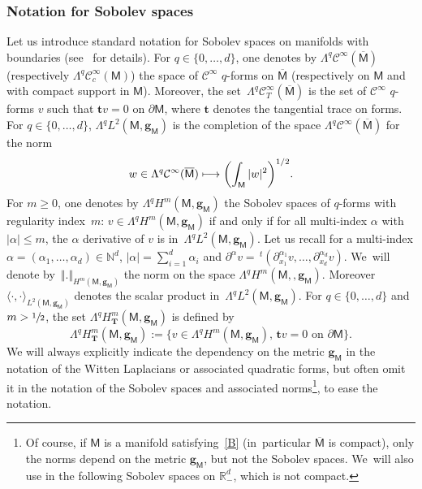 \documentclass[10pt]{amsart}
\newcommand\mto{\mathchoice{\longmapsto}{\mapsto}{\mapsto}{\mapsto}}
\newcommand{\mbf}[1]{\mathbf{#1}}
\theoremstyle{plain}
\theoremstyle{definition}
\begin{document}
\label{sec:Witt}

\subsubsection{Notation for Sobolev spaces}

Let us introduce standard notation for Sobolev spaces on manifolds
with boundaries (see~\cite{GSchw} for details).
For $q\in\{0,\ldots,d\}$, one denotes by
$\Lambda^q\mathcal C^{\infty}(\overline{\mathsf M})$ (respectively $\Lambda^q\mathcal C^\infty_c(\mathsf M)$) the space of $\mathcal C^{\infty}$ $q$-forms on
$\overline{\mathsf M}$ (respectively on $\mathsf M$ and with compact support in $\mathsf M$).
Moreover, the set~$\Lambda^q\mathcal C^{\infty}_T(\overline{\mathsf M})$ is the set of
$\mathcal C^{\infty}$ $q$-forms $v$ such that $\mbf tv=0$ on $\partial
\mathsf M$, where $\mathbf t$ denotes the tangential trace on forms.
For $q\in \{0, \ldots,d\}$, $\Lambda^qL^2(\mathsf M,\mbf g_{\mathsf M})$ is the completion of the space $\Lambda^q\mathcal C^{\infty}(\overline{\mathsf M})$ for the norm\vspace*{-3pt}
\[
w\in \Lambda^q\mathcal C^{\infty}(\overline{\mathsf M})\mto
\biggl(\int_{\mathsf M} \vert w\vert^2 \biggr)^{1/2}.
\]
For $m\ge 0$, one denotes by
$\Lambda^qH^m(\mathsf M,\mbf g_{\mathsf M})$ the Sobolev spaces of $q$-forms with
regularity index~$m$: $v\in \Lambda^qH^m(\mathsf M,\mbf g_{\mathsf
M})$ if and only if for all multi-index $\alpha$ with $\vert \alpha
\vert \le m$, the $\alpha$ derivative of $v$ is
in~$\Lambda^qL^2(\mathsf M,\mbf g_{\mathsf M})$. Let us recall for a
multi-index $\alpha=(\alpha_1,\ldots,\alpha_d) \in \mathbb N^d$, $\vert \alpha
\vert= \sum_{i=1}^d \alpha_i$ and $\partial^\alpha v= \,
^t(\partial_{x_1}^{\alpha_1} v, \ldots, \partial_{x_d}^{\alpha_d} v)$. We~will denote by~$\Vert. \Vert_{H^m(\mathsf M,\mbf g_{\mathsf M})}$ the norm on the space $\Lambda^qH^m
(\mathsf M,,\mbf g_{\mathsf M})$. Moreover $\langle
\cdot, \cdot\rangle_{L^2(\mathsf M,\mbf g_{\mathsf M})}$ denotes the scalar product in~$\Lambda^qL^2 (\mathsf M,\mbf g_{\mathsf M})$.
For $q\in\{0,\ldots,d\}$ and $m> \sfrac{1}{2}$, the set $\Lambda^qH^m_{\mbf T}(\mathsf M,\mbf g_{\mathsf M})$ is defined by\vspace*{-1pt}
\[
\Lambda^qH^m_{\mbf T}(\mathsf M,\mbf g_{\mathsf M}):=\{v\in \Lambda^qH^m(\mathsf M,\mbf g_{\mathsf M}),\,
 \mathbf tv=0 \text{ on } \partial \mathsf M\}.
\]
We will always explicitly indicate the dependency
on the metric $\mbf g_{\mathsf M}$ in the notation of the Witten
Laplacians or associated quadratic forms, but often omit it in the notation of the Sobolev
spaces and associated norms\footnote{Of course, if $\mathsf
M$ is a manifold satisfying~\ref{B} (in~particular $\overline{\mathsf
M}$ is compact),
only the norms depend on the metric $\mbf g_{\mathsf M}$, but not
the Sobolev spaces. We~will also use in the following Sobolev spaces
on $\mathbb R_-^d$, which is not compact.}, to ease the notation.
\end{document}
